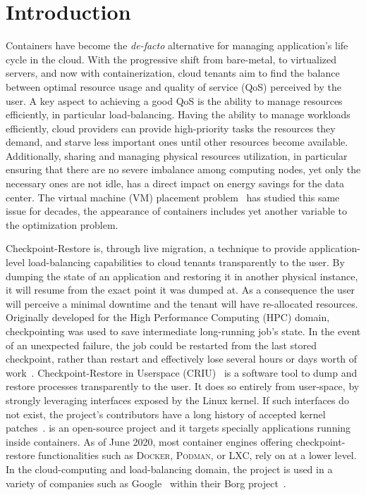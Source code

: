 \chapter{Introduction} \label{chap:introduction}

Containers have become the \textit{de-facto} alternative for managing application's life cycle in the cloud.
With the progressive shift from bare-metal, to virtualized servers, and now with containerization, cloud tenants aim to find the balance between optimal resource usage and quality of service (QoS) perceived by the user.
A key aspect to achieving a good QoS is the ability to manage resources efficiently, in particular load-balancing.
Having the ability to manage workloads efficiently, cloud providers can provide high-priority tasks the resources they demand, and starve less important ones until other resources become available.
Additionally, sharing and managing physical resources utilization, in particular ensuring that there are no severe imbalance among computing nodes, yet only the necessary ones are not idle, has a direct impact on energy savings for the data center.
The virtual machine (VM) placement problem~\cite{Masdari2016,Strunk2012} has studied this same issue for decades, the appearance of containers includes yet another variable to the optimization problem. 

Checkpoint-Restore is, through live migration, a technique to provide application-level load-balancing capabilities to cloud tenants transparently to the user.
By dumping the state of an application and restoring it in another physical instance, it will resume from the exact point it was dumped at.
As a consequence the user will perceive a minimal downtime and the tenant will have re-allocated resources.
Originally developed for the High Performance Computing (HPC) domain, checkpointing was used to save intermediate long-running job's state.
In the event of an unexpected failure, the job could be restarted from the last stored checkpoint, rather than restart and effectively lose several hours or days worth of work~\cite{Barker2014}.
Checkpoint-Restore in Userspace (CRIU)~\cite{criu-main-page} is a software tool to dump and restore processes transparently to the user.
It does so entirely from user-space, by strongly leveraging interfaces exposed by the Linux kernel.
If such interfaces do not exist, the project's contributors have a long history of accepted kernel patches~\cite{criu-kernel-patches}.
\criu is an open-source project and it targets specially applications running inside containers.
As of June 2020, most container engines offering checkpoint-restore functionalities such as \textsc{Docker}, \textsc{Podman}, or \textsc{LXC}, rely on \criu at a lower level.
In the cloud-computing and load-balancing domain, the project is used in a variety of companies such as Google~\cite{Tucker18} within their Borg project~\cite{Verma2015}.

